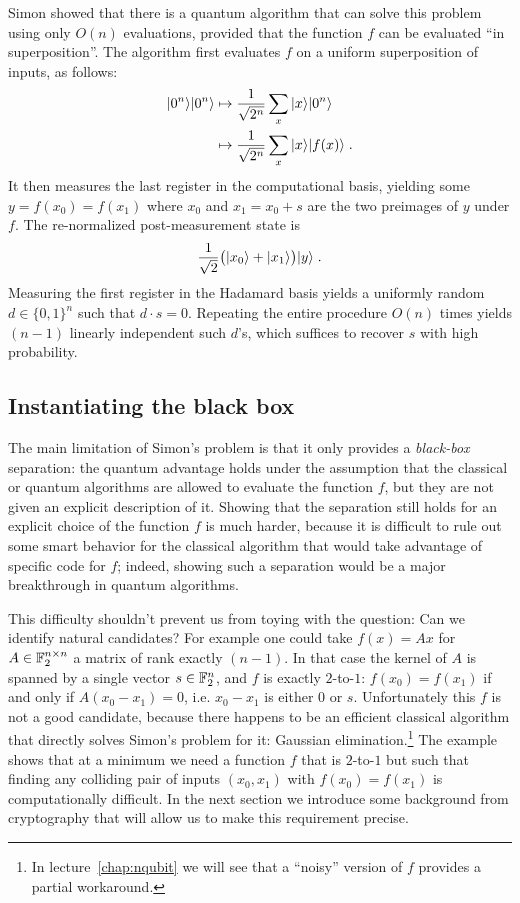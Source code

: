 Simon showed that there is a quantum algorithm that can solve this problem using only $O(n)$ evaluations, provided that the function $f$ can be evaluated ``in superposition''. The algorithm first evaluates $f$ on a uniform superposition of inputs, as follows:
\begin{align*}
|0^n\rangle|0^n\rangle & \mapsto \frac{1}{\sqrt{2^n}}\sum_x |x\rangle |0^n\rangle\notag\\
&\mapsto  \frac{1}{\sqrt{2^n}} \sum_x |x\rangle |f(x)\rangle\notag\;.
\end{align*}
It then measures the last register in the computational basis, yielding some $y=f(x_0)=f(x_1)$ where $x_0$ and $x_1 = x_0+ s$ are the two preimages of $y$ under $f$. The re-normalized post-measurement state is
\begin{equation}
 \frac{1}{\sqrt{2}}\big(|x_0\rangle + |x_1\rangle\big) |y\rangle\;. \label{eq:simon-1}
\end{equation}
Measuring the first register in the Hadamard basis yields a uniformly random $d\in\{0,1\}^n$ such that $d\cdot s = 0$. Repeating the entire procedure $O(n)$ times yields $(n-1)$ linearly independent such $d$'s, which suffices to recover $s$ with high probability. 


\subsection{Instantiating the black box}
\label{sec:simon-instantiate}

The main limitation of Simon's problem is that it only provides a \emph{black-box} separation: the quantum advantage holds under the assumption that the classical or quantum algorithms are allowed to evaluate the function $f$, but they are not given an explicit description of it. Showing that the separation still holds for an explicit choice of the function $f$ is much harder, because it is difficult to rule out some smart behavior for the classical algorithm that would take advantage of specific code for $f$; indeed, showing such a separation would be a major breakthrough in quantum algorithms. 

This difficulty shouldn't prevent us from toying with the question: Can we identify natural candidates? For example one could take $f(x) = Ax$ for $A\in \mathbb{F}_2^{n\times n}$ a matrix of rank exactly $(n-1)$. In that case the kernel of $A$ is spanned by a single vector $s\in\mathbb{F}_2^n$, and $f$ is exactly $2$-to-$1$: $f(x_0)=f(x_1)$ if and only if $A(x_0-x_1)=0$, i.e. $x_0-x_1$ is either $0$ or $s$. 
Unfortunately this $f$ is not a good candidate, because there happens to be an efficient classical algorithm that directly solves Simon's problem for it: Gaussian elimination.\footnote{In lecture~\ref{chap:nqubit} we will see that a ``noisy'' version of $f$ provides a partial workaround.} The example shows that at a minimum we need a function $f$ that is $2$-to-$1$ but such that finding any colliding pair of inputs $(x_0,x_1)$ with $f(x_0)=f(x_1)$ is computationally difficult. In the next section we introduce some background from cryptography that will allow us to make this requirement precise. 

